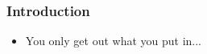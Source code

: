 \begin{frame}
\frametitle{Introduction}

\begin{itemize}
\item You only get out what you put in...
\end{itemize}

\end{frame}



